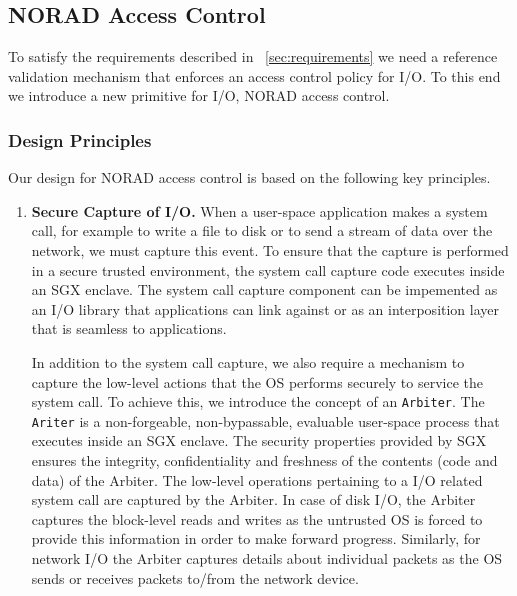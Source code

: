 \documentclass[withindex,glossary]{cam-thesis}
\begin{document}
\subsection{NORAD Access Control} 

To satisfy the requirements described in ~\ref{sec:requirements} we need a reference validation mechanism that enforces an access control policy for I/O.
To this end we introduce a new primitive for I/O, NORAD access control.

\subsubsection{Design Principles} 
Our design for NORAD access control is based on the following key principles.

\begin{enumerate}
\item \textbf{Secure Capture of I/O.}
When a user-space application makes a system call, for example to write a file to disk or to send a stream of data over the network, we must capture this event.
To ensure that the capture is performed in a secure trusted environment, the system call capture code executes inside an SGX enclave.
The system call capture component can be impemented as an I/O library that applications can link against or as an interposition layer that is seamless to applications.

In addition to the system call capture, we also require a mechanism to capture the low-level actions that the OS performs securely to service the system call.
To achieve this, we introduce the concept of an \texttt{Arbiter}.
The \texttt{Ariter} is a non-forgeable, non-bypassable, evaluable user-space process that executes inside an SGX enclave.
The security properties provided by SGX ensures the integrity, confidentiality and freshness of the contents (code and data) of the Arbiter.
The low-level operations pertaining to a I/O related system call are captured by the Arbiter.
In case of disk I/O, the Arbiter captures the block-level reads and writes as the untrusted OS is forced to provide this information in order to make forward progress.
Similarly, for network I/O the Arbiter captures details about individual packets as the OS sends or receives packets to/from the network device.


\end{enumerate}
\end{document}

